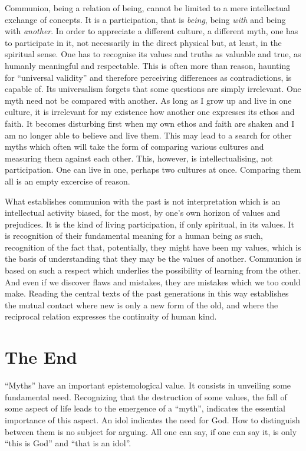 Communion, being a relation of being, cannot be limited to a mere
intellectual exchange of concepts. It is a participation, that is {\em being},
being {\em with} and being with {\em another}. 
In order to appreciate a different culture, a different myth,
one has to participate in it, not necessarily in the direct physical  but, at
least, in the spiritual sense. One has to recognise its values and truths as
valuable and true, as humanly meaningful and respectable. 
This is often more than      %
reason, haunting for
``universal validity'' and therefore perceiving differences as contradictions, 
is capable of. Its universalism forgets that some questions are simply 
irrelevant. One myth need not be compared with another.
As long as I grow up and live in one culture, it is irrelevant for my 
existence how another one expresses its
ethos and faith. It becomes disturbing first when my own ethos and faith are
shaken and I am no longer able to believe and live them. This may lead to
a search for other myths which often will take the form of comparing various
cultures and measuring them against each other. This, however, is 
intellectualising, not participation. One can live in one, perhaps two
cultures at once. Comparing them all is an empty excercise of reason.

What establishes communion with the past is not interpretation which is an
intellectual activity biased, for the most, by one's own horizon of values and
prejudices. It is the kind of living participation, if
only spiritual, in its values. It is recognition of their fundamental meaning
for a human being as such, recognition of the fact that, potentially, they 
might have been my values, which is the basis of understanding that they may 
be the values of another. 
Communion is based on such a respect  which underlies
 the possibility of learning from the other. And even if we discover flaws and
mistakes, they  are mistakes which we too could make.
Reading the central texts of the past 
generations in this way establishes the mutual contact where new is only a new
form of the old, and where the reciprocal relation expresses the continuity of
human kind. 


\section{The End}
``Myths'' have an important epistemological value. It consists in unveiling 
some fundamental need. Recognizing that the destruction of some values, 
the fall of
some aspect of life leads to the emergence of a ``myth'', indicates the 
essential importance of this aspect. An idol indicates the need for God.
How to distinguish between them is no subject for arguing. All one can say, 
if one can say it, is only ``this is God'' and ``that is an idol''.

